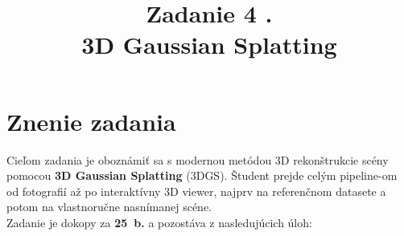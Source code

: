 \documentclass{article}
\title{Zadanie 4 . \\ 3D Gaussian Splatting}
\date{}
\begin{document}
\maketitle

\section*{Znenie zadania}

Cieľom zadania je oboznámiť sa s modernou metódou 3D rekonštrukcie scény pomocou
\textbf{3D Gaussian Splatting} (3DGS).
Študent prejde celým pipeline-om od fotografií až po interaktívny 3D viewer,
najprv na referenčnom datasete a potom na vlastnoručne nasnímanej scéne.
\\[4pt]
Zadanie je dokopy za \textbf{25~b.} a pozostáva z nasledujúcich úloh:
\end{document}
